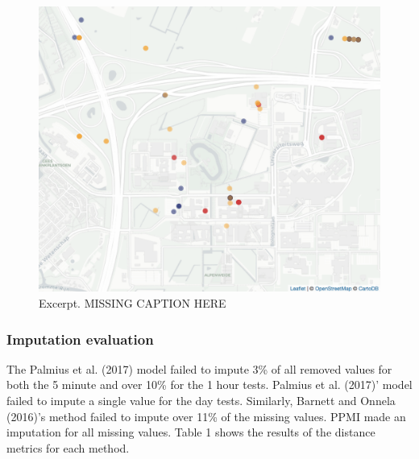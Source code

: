 \documentclass[man]{apa6}
\theoremstyle{definition}
\theoremstyle{definition}
\theoremstyle{definition}
\theoremstyle{remark}
\begin{document}
\begin{figure}
\includegraphics[width=1\linewidth]{img/tempVsspace} \caption{Excerpt. MISSING CAPTION HERE}\label{fig:palmiusVsMe1}
\end{figure}

\subsubsection{Imputation evaluation}\label{imputation-evaluation}

The Palmius et al. (2017) model failed to impute 3\% of all removed
values for both the 5 minute and over 10\% for the 1 hour tests. Palmius
et al. (2017)' model failed to impute a single value for the day tests.
Similarly, Barnett and Onnela (2016)'s method failed to impute over 11\%
of the missing values. PPMI made an imputation for all missing values.
Table 1 shows the results of the distance metrics for each method.
\end{document}

